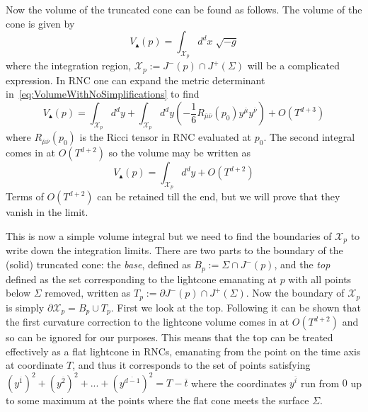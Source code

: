 \documentclass[12pt]{article}
\newcommand{\be}{\begin{equation}}
\newcommand{\ee}{\end{equation}}
\begin{document}
Now the volume of the truncated cone can be found as follows. 
The volume of the cone is given by
\be\label{eq:VolumeWithNoSimplifications}
V_\blacktriangle (p)=\int_{\mathcal{X}_p} d^d x\;\sqrt{-g}
\ee
where the integration region, $\mathcal{X}_p:= J^- (p)\cap J^+ (\Sigma)$ will be a complicated expression. In RNC one can expand the metric determinant in~\eqref{eq:VolumeWithNoSimplifications} to find
\be\label{eq:VolumeWithRNC}
V_\blacktriangle (p) =\int_{\mathcal{X}_p}d^dy+\int_{\mathcal{X}_p}d^dy\left (-\frac{1}{6}R_{\overline{\mu}\overline{\nu}} (p_0)y^{\overline{\mu}}y^{\overline{\nu}} \right)+O (T^{d+3})
\ee
where $R_{\overline{\mu}\overline{\nu}} (p_0)$ is the Ricci tensor in RNC evaluated at $p_0$. The second integral comes in at $O (T^{d+2})$ so the volume may be written as
\be\label{eq:VolumeToLowestOrder}
V_\blacktriangle (p) =\int_{\mathcal{X}_p}d^dy+O (T^{d+2})
\ee
Terms of $O (T^{d+2})$ can be retained till the end, but we will prove that they vanish in the limit.

This is now a simple volume integral but we need to find the boundaries of $\mathcal{X}_p$ to write down the integration limits. There are two parts to the boundary of the (solid) truncated cone: the \emph{base}, defined as $B_p:=\Sigma\cap J^-(p)$, and the \emph{top} defined as the set corresponding to the lightcone emanating at $p$ with all points below $\Sigma$ removed, written as $T_p:=\partial J^-(p)\cap J^+(\Sigma)$. Now the boundary of $\mathcal{X}_p$ is simply $\partial\mathcal{X}_p=B_p\cup T_p$. First we look at the top. Following \cite{Khetrapal_Sumati:Causal_Diamond_Volume} it can be shown that the first curvature correction to the lightcone volume comes in at $O (T^{d+2})$ and so can be ignored for our purposes. This means that the top can be treated effectively as a flat lightcone in RNCs, emanating from the point on the time axis at coordinate $T$, and thus it corresponds to the set of points satisfying $ (y^{\overline{1}})^2+ (y^{\overline{2}})^2+...+ (y^{\overline{d-1}})^2= T-\overline{t}$ where the coordinates  $y^{\overline{i}}$ run from $0$ up to some maximum at the points where the flat cone meets the surface $\Sigma$.
\end{document}
